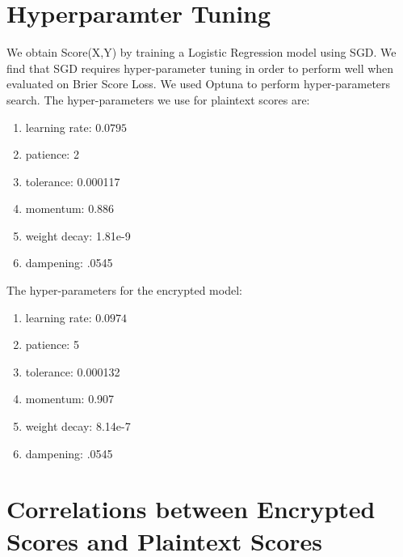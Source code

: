 \section{Hyperparamter Tuning}\label{app:exp_details}
We obtain Score(X,Y) by training a Logistic Regression model using SGD. We find that SGD requires hyper-parameter tuning in order to perform well when evaluated on Brier Score Loss. We used Optuna to perform hyper-parameters search. The hyper-parameters we use for plaintext scores are: 
\begin{enumerate}
    \item learning rate: $0.0795$
    \item patience: 2
    \item tolerance: 0.000117
    \item momentum: 0.886
    \item weight decay: 1.81e-9
    \item dampening: .0545
\end{enumerate}
The hyper-parameters for the encrypted model: 
\begin{enumerate}
    \item learning rate: $0.0974$
    \item patience: 5
    \item tolerance: 0.000132
    \item momentum: 0.907
    \item weight decay: 8.14e-7
    \item dampening: .0545
\end{enumerate}
 

\section{Correlations between Encrypted Scores and Plaintext Scores}\label{app:score_corr}

